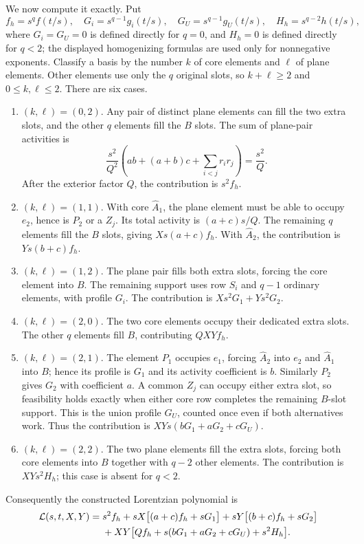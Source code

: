 \documentclass[11pt,a4paper]{article}
\theoremstyle{remark}\newtheorem{remark}[theorem]{Remark}
\begin{document}
We now compute it exactly. Put
\[
 f_h=s^qf(t/s),\quad G_i=s^{q-1}g_i(t/s),\quad
 G_U=s^{q-1}g_U(t/s),\quad H_h=s^{q-2}h(t/s),
\]
where $G_i=G_U=0$ is defined directly for $q=0$, and $H_h=0$ is defined directly for $q<2$; the displayed homogenizing formulas are used only for nonnegative exponents. Classify a basis by the number $k$ of core elements and $\ell$ of plane elements. Other elements use only the $q$ original slots, so $k+\ell\ge2$ and $0\le k,\ell\le2$. There are six cases.
\begin{enumerate}
\item $(k,\ell)=(0,2)$. Any pair of distinct plane elements can fill the two extra slots, and the other $q$ elements fill the $B$ slots. The sum of plane-pair activities is
\[
 \frac{s^2}{Q^2}\left(ab+(a+b)c+\sum_{i<j}r_ir_j\right)=\frac{s^2}{Q}.
\]
After the exterior factor $Q$, the contribution is $s^2f_h$.
\item $(k,\ell)=(1,1)$. With core $\widehat A_1$, the plane element must be able to occupy $e_2$, hence is $P_2$ or a $Z_j$. Its total activity is $(a+c)s/Q$. The remaining $q$ elements fill the $B$ slots, giving $Xs(a+c)f_h$. With $\widehat A_2$, the contribution is $Ys(b+c)f_h$.
\item $(k,\ell)=(1,2)$. The plane pair fills both extra slots, forcing the core element into $B$. The remaining support uses row $S_i$ and $q-1$ ordinary elements, with profile $G_i$. The contribution is $Xs^2G_1+Ys^2G_2$.
\item $(k,\ell)=(2,0)$. The two core elements occupy their dedicated extra slots. The other $q$ elements fill $B$, contributing $QXYf_h$.
\item $(k,\ell)=(2,1)$. The element $P_1$ occupies $e_1$, forcing $\widehat A_2$ into $e_2$ and $\widehat A_1$ into $B$; hence its profile is $G_1$ and its activity coefficient is $b$. Similarly $P_2$ gives $G_2$ with coefficient $a$. A common $Z_j$ can occupy either extra slot, so feasibility holds exactly when either core row completes the remaining $B$-slot support. This is the union profile $G_U$, counted once even if both alternatives work. Thus the contribution is $XYs(bG_1+aG_2+cG_U)$.
\item $(k,\ell)=(2,2)$. The two plane elements fill the extra slots, forcing both core elements into $B$ together with $q-2$ other elements. The contribution is $XYs^2H_h$; this case is absent for $q<2$.
\end{enumerate}
Consequently the constructed Lorentzian polynomial is
\begin{align}\label{mrn:w:rf:eq:fulllift}
 \mathcal L(s,t,X,Y)={}&s^2f_h+sX\big[(a+c)f_h+sG_1\big]
 +sY\big[(b+c)f_h+sG_2\big]\notag\\
 &+XY\big[Qf_h+s(bG_1+aG_2+cG_U)+s^2H_h\big].
\end{align}
\end{document}
